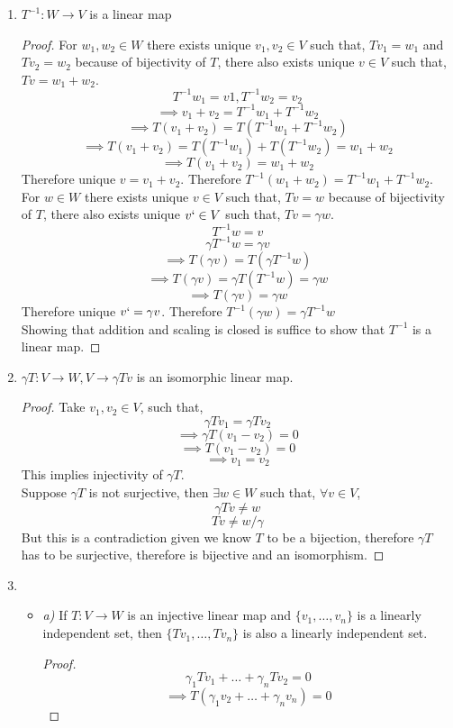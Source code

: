 \documentclass[11pt,a4paper]{colorart}
\def\l{\left}
\def\r{\right}
\def\g{\gamma}
\begin{document}
\begin{enumerate}
	\item $T^{-1}:W\rightarrow V$ is a linear map
		\begin{proof}
			For $w_1,w_2\in W$ there exists unique $v_1,v_2\in V$ such that, $Tv_1=w_1$ and $Tv_2=w_2$ because of bijectivity of $T$, there also exists unique $v\in V$ such that, $Tv=w_1+w_2$. 
			\[T^{-1}w_1=v1,T^{-1}w_2=v_2\] 
			\[ \implies v_1+v_2=T^{-1}w_1+T^{-1}w_2\] 
			\[ \implies T\l(v_1+v_2\r)=T\l(T^{-1}w_1+T^{-1}w_2\r)\] 
			\[\implies T\l(v_1+v_2\r)=T\l(T^{-1}w_1\r)+T\l(T^{-1}w_2\r) = w_1+w_2 \]
			\[ \implies T\l(v_1+v_2\r) = w_1+w_2 \]
			Therefore unique $v=v_1+v_2$. Therefore $T^{-1}\l(w_1+w_2\r)=T^{-1}w_1+T^{-1}w_2$.\\
			For $w\in W$ there exists unique $v\in V$ such that, $Tv=w$ because of bijectivity of $T$, there also exists unique $v`\in V$ such that, $Tv=\g w$. 
			\[T^{-1}w=v\] 
			\[\g T^{-1}w=\g v\] 
			\[ \implies T\l(\g v\r)=T\l(\g T^{-1}w\r)\] 
			\[\implies T\l(\g v\r)=\g T\l(T^{-1}w\r) = \g w \]
			\[\implies T\l(\g v\r) = \g w \]
			Therefore unique $v`=\g v$. Therefore $T^{-1}\l(\g w\r)=\g T^{-1}w$\\
			Showing that addition and scaling is closed is suffice to show that $T^{-1}$ is a linear map.
		\end{proof}
	\item $\g T:V\rightarrow W, V\rightarrow \g Tv$ is an isomorphic linear map.
		\begin{proof}
			Take $v_1,v_2\in V$, such that,
			\[ \g Tv_1=\g Tv_2 \]
			\[ \implies \g T\l(v_1-v_2\r) = 0 \]
			\[ \implies T\l(v_1-v_2\r) = 0 \]
			\[ \implies v_1 = v_2 \]
			This implies injectivity of $\g T$.\\
			Suppose $\g T$ is not surjective, then $\exists w\in W$ such that, $\forall v\in V$,
			\[ \g Tv \neq w \]
			\[ Tv \neq w/\g \]
			But this is a contradiction given we know $T$ to be a bijection, therefore $\g T$ has to be surjective, therefore is bijective and an isomorphism.
		\end{proof}
	\item 
		\begin{itemize}
			\item \textit{a)} If $T:V\rightarrow W$ is an injective linear map and $\{v_1,\dots,v_n\}$ is a linearly independent set, then $\{Tv_1,\dots,Tv_n\}$ is also a linearly independent set.
				\begin{proof}
					\[ \g_1Tv_1 + \dots + \g_nTv_2 = 0 \]
					\[ \implies T\l(\g_1v_2 + \dots + \g_nv_n\r) = 0\]

\end{proof}
\end{itemize}
\end{enumerate}
\end{document}
